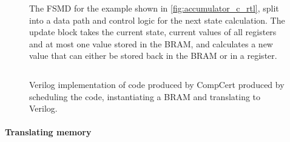 \begin{figure}
\caption[Diagram of the FSMD for the example.]{The FSMD for the example shown in
  \cref{fig:accumulator_c_rtl}, split into a data path and control logic for the
  next state calculation.  The update block takes the current state, current
  values of all registers and at most one value stored in the \gls{BRAM}, and
  calculates a new value that can either be stored back in the \gls{BRAM} or in
  a register.}\label{fig:accumulator_diagram}
\end{figure}

\begin{figure}
  \centering
  \inputminted[fontsize=\footnotesize,linenos,xleftmargin=20pt]{systemverilog}{figures/3-introduction-to-vericert/translated-verilog.sv}
  \caption[Verilog implementation of the \textsc{Rtl} code.]{Verilog
    implementation of \rtl{} code produced by CompCert produced by scheduling
    the code, instantiating a BRAM and translating to Verilog.}
  \label{fig:accumulator_v}
\end{figure}

\paragraph{Translating memory}

